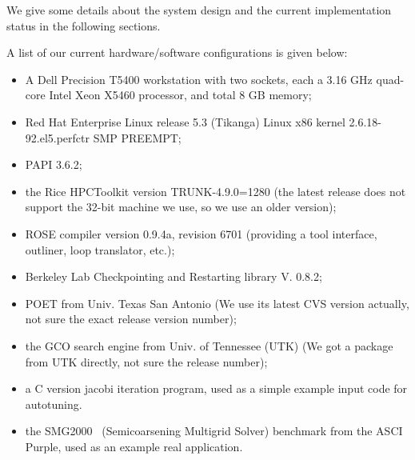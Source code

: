 We give some details about the system design and the current implementation
status in the following sections. 

A list of our current hardware/software configurations is given below:
\begin{itemize}
   \item A Dell Precision T5400 workstation with two sockets, each a 3.16
   GHz quad-core Intel Xeon X5460 processor, and total 8 GB memory; 
   \item Red Hat Enterprise Linux release 5.3 (Tikanga) Linux x86 kernel
   2.6.18-92.el5.perfctr SMP PREEMPT;
   \item PAPI 3.6.2;
   \item the Rice HPCToolkit version TRUNK-4.9.0=1280 (the latest
         release does not support the 32-bit machine we use, so we use an
         older version); 
   \item ROSE compiler version 0.9.4a, revision 6701 (providing a tool
       interface, outliner, loop translator, etc.);
   \item Berkeley Lab Checkpointing and Restarting library V. 0.8.2;
   \item POET from Univ. Texas San Antonio (We use its latest CVS version
         actually, not sure the exact release version number);
   \item the GCO search engine from Univ. of Tennessee (UTK) (We got a package from
         UTK directly, not sure the release number); 
   \item a C version jacobi iteration program, used as a simple example
   input code for autotuning.      

   \item the SMG2000~\cite{BrownSemicoarsening2000} (Semicoarsening Multigrid
         Solver) benchmark from the ASCI Purple, used as an example real
         application.
\end{itemize}


